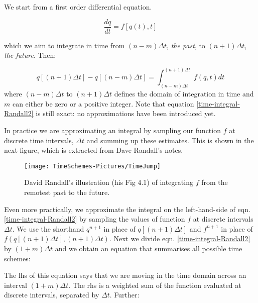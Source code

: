 We start from a first order differential equation.

\begin{equation}
	\frac{dq}{dt}=f[q(t),t]
\end{equation}

which we aim to integrate in time from $(n-m)\Delta t$, \emph{the past}, to $(n+1)\Delta t$, \emph{the future}. Then:

\begin{equation}
	q[(n+1) \Delta t] - q[(n-m)\Delta t] = \int_{(n-m)\Delta t}^{(n+1)\Delta t} f(q,t) dt
	\label{time-integral-Randall2}
\end{equation}
where $(n-m)\Delta t$ to $(n+1)\Delta t$ defines the domain of integration in time and $m$ can either be zero or a positive integer. Note that equation \ref{time-integral-Randall2} is still exact: no approximations have been introduced yet.

In practice we are approximating an integral by sampling our function $f$ at discrete time intervals, $\Delta t$ and summing up these estimates. This is shown in the next figure, which is extracted from Dave Randall's notes.

\begin{figure}[h!]
	\texttt{[image: TimeSchemes-Pictures/TimeJump]}
	\caption{David Randall's illustration (his Fig 4.1) of integrating $f$ from the remotest past to the future.}
	\label{TImeJump}
\end{figure}

Even more practically, we approximate the integral on the left-hand-side of eqn. \ref{time-integral-Randall2} by sampling the values of function $f$ at discrete intervals $\Delta t$. We use the shorthand $q^{n+1}$ in place of $q[(n+1) \Delta t]$ and $f^{n+1}$ in place of $f(q[(n+1) \Delta t], (n+1) \Delta t)$. Next we divide eqn.  \ref{time-integral-Randall2} by $(1+m) \Delta t$ and we obtain an equation that summarises all possible time schemes:


The lhs of this equation says that we are moving in the time domain across an interval $(1+m) \Delta t$. The rhs is a weighted sum of the function evaluated at discrete intervals, separated by $\Delta t$. Further:


